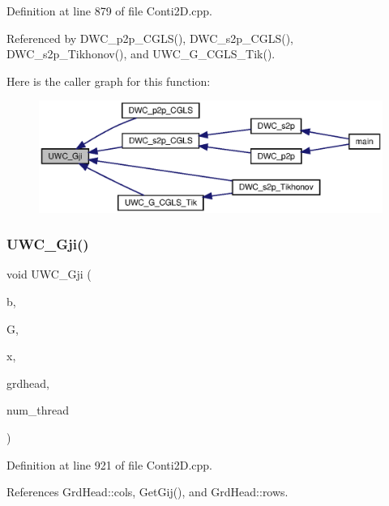 Definition at line 879 of file Conti2\+D.\+cpp.



Referenced by D\+W\+C\+\_\+p2p\+\_\+\+C\+G\+L\+S(), D\+W\+C\+\_\+s2p\+\_\+\+C\+G\+L\+S(), D\+W\+C\+\_\+s2p\+\_\+\+Tikhonov(), and U\+W\+C\+\_\+\+G\+\_\+\+C\+G\+L\+S\+\_\+\+Tik().

Here is the caller graph for this function\+:\nopagebreak
\begin{figure}[H]
\begin{center}
\leavevmode
\includegraphics[width=350pt]{Conti2D_8cpp_a9d30373a0ff29e4f743eaf5e4cbc3cbf_a9d30373a0ff29e4f743eaf5e4cbc3cbf_icgraph}
\end{center}
\end{figure}
\mbox{\label{Conti2D_8cpp_a7ab8990653bc3bdbef25f3b17e949f0f_a7ab8990653bc3bdbef25f3b17e949f0f}} 
\subsubsection{U\+W\+C\+\_\+\+Gji()\hspace{0.1cm}{\footnotesize\ttfamily [2/2]}}
{\footnotesize\ttfamily void U\+W\+C\+\_\+\+Gji (\begin{DoxyParamCaption}\item[{double $\ast$}]{b,  }\item[{double $\ast$}]{G,  }\item[{double $\ast$}]{x,  }\item[{\textbf{ Grd\+Head}}]{grdhead,  }\item[{int}]{num\+\_\+thread }\end{DoxyParamCaption})}



Definition at line 921 of file Conti2\+D.\+cpp.



References Grd\+Head\+::cols, Get\+Gij(), and Grd\+Head\+::rows.

